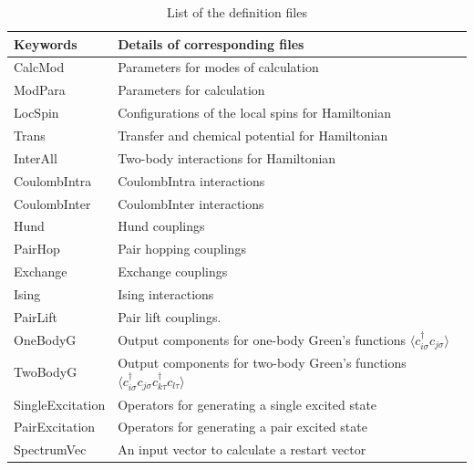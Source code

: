  \begin{table}[h!]
\begin{center}
  \begin{tabular}{ll|} \hline
           Keywords     & Details of corresponding files       \\   \hline\hline
           CalcMod      &   Parameters for modes of calculation  \\  \hline  
           ModPara       &  Parameters for calculation        \\ \hline   
           LocSpin         &  Configurations of the local spins for Hamiltonian         \\ 
           Trans       &   Transfer and chemical potential for Hamiltonian  \\
           InterAll  &   Two-body interactions for Hamiltonian\\  
           CoulombIntra  &   CoulombIntra interactions\\  
           CoulombInter  &   CoulombInter  interactions\\  
           Hund  &   Hund couplings\\  
           PairHop  &  Pair hopping couplings \\  
           Exchange  &  Exchange couplings \\  
           Ising  &  Ising interactions \\  
           PairLift  &   Pair lift couplings.\\  
           OneBodyG         &   Output components for one-body Green's functions $\langle c_{i\sigma}^{\dagger}c_{j\sigma}\rangle$           \\   
           TwoBodyG &   Output components for two-body Green's functions $\langle c_{i\sigma}^{\dagger}c_{j\sigma}c_{k\tau}^{\dagger}c_{l\tau}\rangle$  \\ 
           {SingleExcitation} &   Operators for generating a single excited state\\ 
           {PairExcitation} &   Operators for generating a pair excited state\\   
           {SpectrumVec} &   An input vector to calculate a restart vector\\   
  \hline
  \end{tabular}
\end{center}
\caption{List of the definition files}
\label{Table:Defs}
\end{table}%

\newpage
